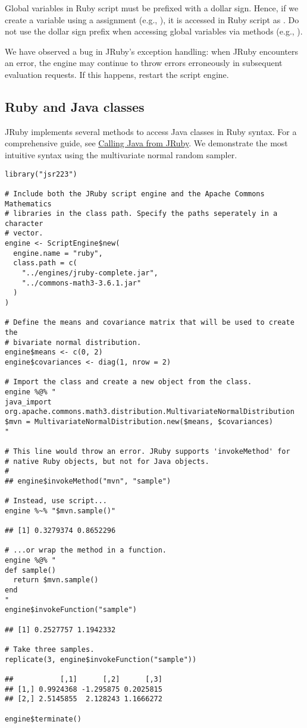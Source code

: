 
 Global variables in Ruby script must be prefixed with a dollar sign. Hence, if we create a variable  using a  assignment (e.g., ), it is accessed in Ruby script as . Do not use the dollar sign prefix when accessing global variables via  methods (e.g., ).

 We have observed a bug in JRuby's exception handling: when JRuby encounters an error, the engine may continue to throw errors erroneously in subsequent evaluation requests. If this happens, restart the script engine.

\subsection{Ruby and Java classes}

JRuby implements several methods to access Java classes in Ruby syntax. For a comprehensive guide, see \href{https://github.com/jruby/jruby/wiki/CallingJavaFromJRuby}{Calling Java from JRuby}. We demonstrate the most intuitive syntax using the multivariate normal random sampler.

\begin{verbatim}
library("jsr223")

# Include both the JRuby script engine and the Apache Commons Mathematics
# libraries in the class path. Specify the paths seperately in a character
# vector.
engine <- ScriptEngine$new(
  engine.name = "ruby", 
  class.path = c(
    "../engines/jruby-complete.jar",
    "../commons-math3-3.6.1.jar"
  )
)

# Define the means and covariance matrix that will be used to create the 
# bivariate normal distribution.
engine$means <- c(0, 2)
engine$covariances <- diag(1, nrow = 2)

# Import the class and create a new object from the class.
engine %@% "
java_import org.apache.commons.math3.distribution.MultivariateNormalDistribution
$mvn = MultivariateNormalDistribution.new($means, $covariances)
"

# This line would throw an error. JRuby supports 'invokeMethod' for
# native Ruby objects, but not for Java objects.
# 
## engine$invokeMethod("mvn", "sample")

# Instead, use script...
engine %~% "$mvn.sample()"

## [1] 0.3279374 0.8652296

# ...or wrap the method in a function.
engine %@% "
def sample()
  return $mvn.sample()
end
"
engine$invokeFunction("sample")

## [1] 0.2527757 1.1942332

# Take three samples.
replicate(3, engine$invokeFunction("sample"))

##           [,1]      [,2]      [,3]
## [1,] 0.9924368 -1.295875 0.2025815
## [2,] 2.5145855  2.128243 1.1666272

engine$terminate()
\end{verbatim}

